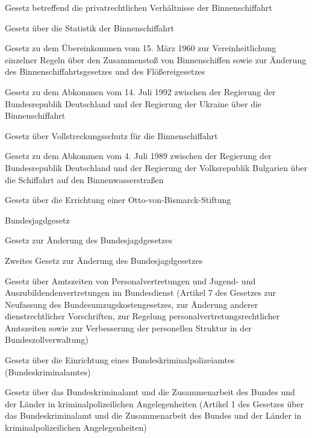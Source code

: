 \item[{BinSchPRG}] Gesetz betreffend die privatrechtlichen Verhältnisse der Binnenschiffahrt

\item[{BinSchStatG}] Gesetz über die Statistik der Binnenschiffahrt

\item[{BinSchÜbkG}] Gesetz zu dem Übereinkommen vom 15. März 1960 zur Vereinheitlichung einzelner Regeln über den Zusammenstoß von Binnenschiffen sowie zur Änderung des Binnenschiffahrtsgesetzes und des Flößereigesetzes

\item[{BinSchUkrAbkG}] Gesetz zu dem Abkommen vom 14. Juli 1992 zwischen der Regierung der Bundesrepublik Deutschland und der Regierung der Ukraine über die Binnenschiffahrt

\item[{BinSchVollstrSchG}] Gesetz über Vollstreckungsschutz für die Binnenschiffahrt

\item[{BinWaStrBGRAbkG}] Gesetz zu dem Abkommen vom 4. Juli 1989 zwischen der Regierung der Bundesrepublik Deutschland und der Regierung der Volksrepublik Bulgarien über die Schiffahrt auf den Binnenwasserstraßen

\item[{BismStiftG}] Gesetz über die Errichtung einer Otto-von-Bismarck-Stiftung

\item[{BJagdG}] Bundesjagdgesetz

\item[{BJagdGÄndG}] Gesetz zur Änderung des Bundesjagdgesetzes

\item[{BJagdGÄndG-2}] Zweites Gesetz zur Änderung des Bundesjagdgesetzes

\item[{BJAPersVAzG}] Gesetz über Amtszeiten von Personalvertretungen und Jugend- und Auszubildendenvertretungen im Bundesdienst (Artikel 7 des Gesetzes zur Neufassung des Bundesumzugskostengesetzes, zur Änderung anderer dienstrechtlicher Vorschriften, zur Regelung personalvertretungsrechtlicher Amtszeiten sowie zur Verbesserung der personellen Struktur in der Bundeszollverwaltung)

\item[{BKAG}] Gesetz über die Einrichtung eines Bundeskriminalpolizeiamtes (Bundeskriminalamtes)

\item[{BKAG-1997}] Gesetz über das Bundeskriminalamt und die Zusammenarbeit des Bundes und der Länder in kriminalpolizeilichen Angelegenheiten (Artikel 1 des Gesetzes über das Bundeskriminalamt und die Zusammenarbeit des Bundes und der Länder in kriminalpolizeilichen Angelegenheiten)


